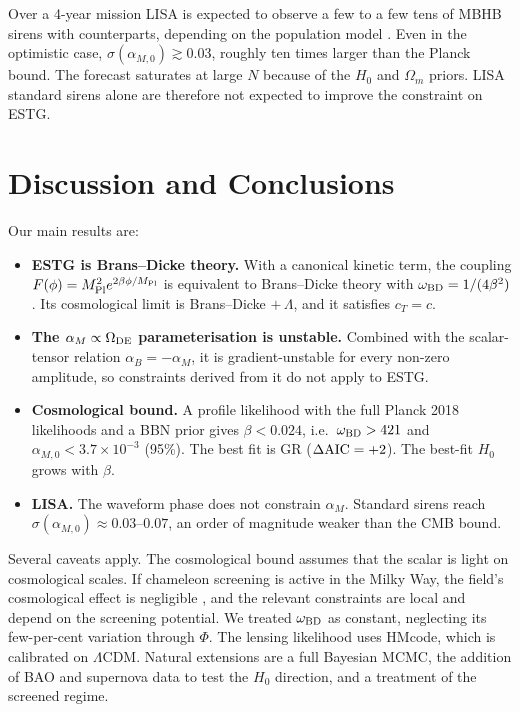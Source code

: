 \documentclass[11pt,a4paper]{article}
\begin{document}
Over a 4-year mission LISA is expected to observe a few to a few tens of MBHB sirens with counterparts, depending on the population model \cite{Tamanini2016}. Even in the optimistic case, $\sigma(\alpha_{M,0}) \gtrsim 0.03$, roughly ten times larger than the Planck bound. The forecast saturates at large $N$ because of the $H_0$ and $\Omega_m$ priors. LISA standard sirens alone are therefore not expected to improve the constraint on ESTG.

\section{Discussion and Conclusions}
Our main results are:
\begin{itemize}
    \item \textbf{ESTG is Brans--Dicke theory.} With a canonical kinetic term, the coupling $F(\phi) = M_{\rm Pl}^2 e^{2\beta\phi/M_{\rm Pl}}$ is equivalent to Brans--Dicke theory with $\omega_{\rm BD} = 1/(4\beta^2)$. Its cosmological limit is Brans--Dicke $+\,\Lambda$, and it satisfies $c_T = c$.
    \item \textbf{The $\alpha_M \propto \Omega_{\rm DE}$ parameterisation is unstable.} Combined with the scalar-tensor relation $\alpha_B = -\alpha_M$, it is gradient-unstable for every non-zero amplitude, so constraints derived from it do not apply to ESTG.
    \item \textbf{Cosmological bound.} A profile likelihood with the full Planck 2018 likelihoods and a BBN prior gives $\beta < 0.024$, i.e.\ $\omega_{\rm BD} > 421$ and $\alpha_{M,0} < 3.7\times10^{-3}$ (95\%). The best fit is GR ($\Delta{\rm AIC} = +2$). The best-fit $H_0$ grows with $\beta$.
    \item \textbf{LISA.} The waveform phase does not constrain $\alpha_M$. Standard sirens reach $\sigma(\alpha_{M,0}) \approx 0.03$--$0.07$, an order of magnitude weaker than the CMB bound.
\end{itemize}

Several caveats apply. The cosmological bound assumes that the scalar is light on cosmological scales. If chameleon screening is active in the Milky Way, the field's cosmological effect is negligible \cite{WangHuiKhoury2012}, and the relevant constraints are local and depend on the screening potential. We treated $\omega_{\rm BD}$ as constant, neglecting its few-per-cent variation through $\Phi$. The lensing likelihood uses HMcode, which is calibrated on $\Lambda$CDM. Natural extensions are a full Bayesian MCMC, the addition of BAO and supernova data to test the $H_0$ direction, and a treatment of the screened regime.
\end{document}

